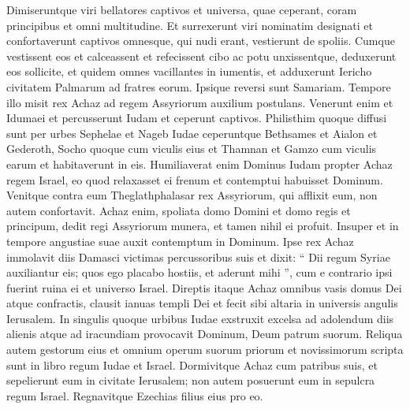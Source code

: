 \begin{biblechapter}
\begin{biblechapter}
\begin{biblechapter}
\begin{biblechapter}
\begin{biblechapter}
\begin{biblechapter}
\begin{biblechapter}
\begin{biblechapter}
\begin{biblechapter}
\begin{biblechapter}
\begin{biblechapter}
\begin{biblechapter}
\begin{biblechapter}
\begin{biblechapter}
\begin{biblechapter}
\begin{biblechapter}
\begin{biblechapter}
\begin{biblechapter}
\begin{biblechapter}
\begin{biblechapter}
\begin{biblechapter}
\begin{biblechapter}
\begin{biblechapter}
\begin{biblechapter}
\begin{biblechapter}
\begin{biblechapter}
\begin{biblechapter}
\begin{biblechapter}
 \verse Dimiseruntque viri bellatores captivos et universa, quae ceperant, coram principibus et omni multitudine. 
\verse Et surrexerunt viri nominatim designati et confortaverunt captivos omnesque, qui nudi erant, vestierunt de spoliis. Cumque vestissent eos et calceassent et refecissent cibo ac potu unxissentque, deduxerunt eos sollicite, et quidem omnes vacillantes in iumentis, et adduxerunt Iericho civitatem Palmarum ad fratres eorum. Ipsique reversi sunt Samariam.
 \verse Tempore illo misit rex Achaz ad regem Assyriorum auxilium postulans.
 \verse Venerunt enim et Idumaei et percusserunt Iudam et ceperunt captivos. 
\verse Philisthim quoque diffusi sunt per urbes Sephelae et Nageb Iudae ceperuntque Bethsames et Aialon et Gederoth, Socho quoque cum viculis eius et Thamnan et Gamzo cum viculis earum et habitaverunt in eis. 
\verse Humiliaverat enim Dominus Iudam propter Achaz regem Israel, eo quod relaxasset ei frenum et contemptui habuisset Dominum. 
\verse Venitque contra eum Theglathphalasar rex Assyriorum, qui afflixit eum, non autem confortavit. 
\verse Achaz enim, spoliata domo Domini et domo regis et principum, dedit regi Assyriorum munera, et tamen nihil ei profuit.
 \verse Insuper et in tempore angustiae suae auxit contemptum in Dominum. Ipse rex Achaz 
\verse immolavit diis Damasci victimas percussoribus suis et dixit: “ Dii regum Syriae auxiliantur eis; quos ego placabo hostiis, et aderunt mihi ”, cum e contrario ipsi fuerint ruina ei et universo Israel. 
\verse Direptis itaque Achaz omnibus vasis domus Dei atque confractis, clausit ianuas templi Dei et fecit sibi altaria in universis angulis Ierusalem. 
\verse In singulis quoque urbibus Iudae exstruxit excelsa ad adolendum diis alienis atque ad iracundiam provocavit Dominum, Deum patrum suorum.
 \verse Reliqua autem gestorum eius et omnium operum suorum priorum et novissimorum scripta sunt in libro regum Iudae et Israel. 
\verse Dormivitque Achaz cum patribus suis, et sepelierunt eum in civitate Ierusalem; non autem posuerunt eum in sepulcra regum Israel. Regnavitque Ezechias filius eius pro eo.
 

\end{biblechapter}
\end{biblechapter}
\end{biblechapter}
\end{biblechapter}
\end{biblechapter}
\end{biblechapter}
\end{biblechapter}
\end{biblechapter}
\end{biblechapter}
\end{biblechapter}
\end{biblechapter}
\end{biblechapter}
\end{biblechapter}
\end{biblechapter}
\end{biblechapter}
\end{biblechapter}
\end{biblechapter}
\end{biblechapter}
\end{biblechapter}
\end{biblechapter}
\end{biblechapter}
\end{biblechapter}
\end{biblechapter}
\end{biblechapter}
\end{biblechapter}
\end{biblechapter}
\end{biblechapter}
\end{biblechapter}
